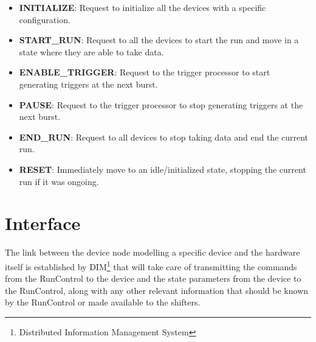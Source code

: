 \documentclass[a4paper]{article}
\begin{document}
\begin{itemize}
	\item \textbf{INITIALIZE}: Request to initialize all the devices with a specific configuration.
	\item \textbf{START\_RUN}: Request to all the devices to start the run and move
	in a state where they are able to take data.
	\item \textbf{ENABLE\_TRIGGER}: Request to the trigger processor to start
	generating triggers at the next burst.
	\item \textbf{PAUSE}: Request to the trigger processor to stop generating
	triggers at the next burst.
	\item \textbf{END\_RUN}: Request to all devices to stop taking data and end the
	current run.
	\item \textbf{RESET}: Immediately move to an idle/initialized state, stopping
	the current run if it was ongoing.
\end{itemize}

\section{Interface}
The link between the device node modelling a specific device and the hardware itself is
established by DIM\cite{biblio:DIM}\footnote{Distributed Information Management System} that will
take care of transmitting the commands from the RunControl to the device and the state parameters from the
device to the RunControl, along with any other relevant information that should be known by the
RunControl or made available to the shifters.
\end{document}
